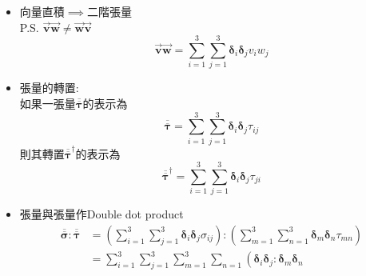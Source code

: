 \documentclass[../main.tex]{subfiles}
\begin{document}
\begin{itemize}
\begin{itemize}
\begin{align}
          \right] \nonumber\\
          &= \sum_{i=1}^3 \sum_{j=1}^3 \sum_{k=1}^3 \sum_{l=1}^3 \varepsilon_{jkl} (\bm \delta_i \cdot \bm \delta_l) u_i v_j w_k,\quad (l=1) \nonumber\\
          &= \sum_{i=1}^3 \sum_{j=1}^3 \sum_{k=1}^3 \varepsilon_{jki} u_i v_j w_k \nonumber\\
          &= \sum_{i=1}^3 \sum_{j=1}^3 \sum_{k=1}^3 \varepsilon_{ijk} u_i v_j w_k \nonumber\\
          &= \begin{vmatrix}
            u_1 & u_2 & u_3 \\
            v_1 & v_2 & v_3 \\
            w_1 & w_2 & w_3
          \end{vmatrix}
        \end{align}
      \item 向量直積$\implies$二階張量\\
        P.S. $\vec{\bm v} \vec{\bm w} \neq \vec{\bm w} \vec{\bm v}$
        \begin{equation}
          \vec {\bm v} \vec {\bm w} = \sum_{i=1}^3 \sum_{j=1}^3 \bm \delta_i \bm \delta_j v_i w_j
        \end{equation}
      \item 張量的轉置:\\
        如果一張量$\overline{\overline {\bm \tau}}$的表示為
        \begin{equation}
          \overline{\overline {\bm \tau}} = \sum_{i=1}^3 \sum_{j=1}^3 \bm \delta_i \bm \delta_j \tau_{ij}
        \end{equation}
        則其轉置$\overline{\overline {\bm \tau}}^\dagger$的表示為
        \begin{equation}
          \overline{\overline {\bm \tau}}^\dagger = \sum_{i=1}^3 \sum_{j=1}^3 \bm \delta_i \bm \delta_j \tau_{ji}
        \end{equation}
      \item 張量與張量作Double dot product
        \begin{align}
          \overline{\overline {\bm \sigma}} : \overline{\overline {\bm \tau}} &=
          \left(\sum_{i=1}^3 \sum_{j=1}^3 \bm \delta_i \bm \delta_j \sigma_{ij}\right) :
          \left(\sum_{m=1}^3 \sum_{n=1}^3 \bm \delta_m \bm \delta_n \tau_{mn}\right) \nonumber\\
          &= \sum_{i=1}^3 \sum_{j=1}^3 \sum_{m=1}^3 \sum_{n=1} \left(
            \bm \delta_i \bm \delta_j : \bm\delta_m\bm\delta_n

\end{align}
\end{itemize}
\end{itemize}
\end{document}

